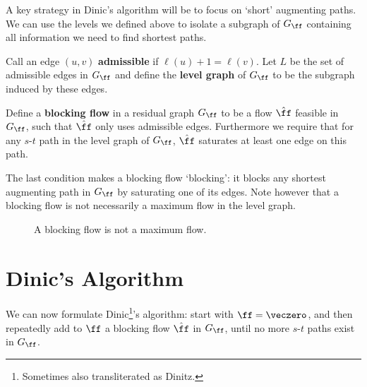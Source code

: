 A key strategy in Dinic's algorithm will be to focus on `short' augmenting paths. We can use the levels we
defined above to isolate a subgraph of $G_{\ff}$ containing all information we need to find shortest paths.
\begin{definition}
  Call an edge $(u, v)$ \textbf{admissible} if $\ell(u)+1 = \ell(v)$. Let $L$ be the set of
  admissible edges in $G_{\ff}$ and define the \textbf{level graph} of $G_{\ff}$ to be the subgraph
  induced by these edges.
\end{definition}

\begin{definition}
  Define a \textbf{blocking flow} in a residual graph $G_{\ff}$ to be a flow $\hat{\ff}$ feasible in $G_{\ff}$,
  such that $\hat{\ff}$ only uses admissible edges. Furthermore we require that for any $s$-$t$ path in
  the level graph of $G_{\ff}$, $\hat{\ff}$ saturates at least one edge on this path.
\end{definition}

The last condition makes a blocking flow `blocking': it blocks any shortest augmenting path in $G_{\ff}$ by
saturating one of its edges. Note however that a blocking flow is not necessarily a maximum flow in the
level graph.

\begin{figure}
  \centering
  \caption{A blocking flow is not a maximum flow.}
\end{figure}

\section{Dinic's Algorithm}
We can now formulate Dinic\footnote{Sometimes also transliterated as Dinitz.}'s algorithm: start with
$\ff = \veczero$, and then repeatedly add to $\ff$ a blocking flow $\hat{\ff}$ in $G_{\ff}$, until no more $s$-$t$ paths
exist in $G_{\ff}$.

